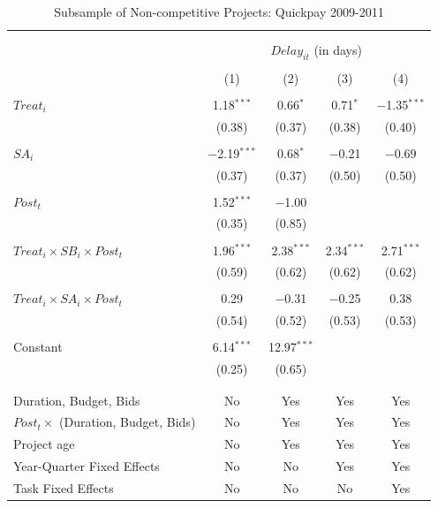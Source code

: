 \documentclass[
]{article}
\begin{document}
\begin{table}[H] \centering 
  \caption{Subsample of Non-competitive Projects: Quickpay 2009-2011} 
  \label{} 
\small 
\begin{tabular}{@{\extracolsep{-2pt}}lcccc} 
\\[-1.8ex]\hline 
\hline \\[-1.8ex] 
\\[-1.8ex] & \multicolumn{4}{c}{$Delay_{it}$ (in days)} \\ 
\\[-1.8ex] & (1) & (2) & (3) & (4)\\ 
\hline \\[-1.8ex] 
 $Treat_i$ & 1.18$^{***}$ & 0.66$^{*}$ & 0.71$^{*}$ & $-$1.35$^{***}$ \\ 
  & (0.38) & (0.37) & (0.38) & (0.40) \\ 
  & & & & \\ 
 $SA_i$ & $-$2.19$^{***}$ & 0.68$^{*}$ & $-$0.21 & $-$0.69 \\ 
  & (0.37) & (0.37) & (0.50) & (0.50) \\ 
  & & & & \\ 
 $Post_t$ & 1.52$^{***}$ & $-$1.00 &  &  \\ 
  & (0.35) & (0.85) &  &  \\ 
  & & & & \\ 
 $Treat_i \times SB_i \times Post_t$ & 1.96$^{***}$ & 2.38$^{***}$ & 2.34$^{***}$ & 2.71$^{***}$ \\ 
  & (0.59) & (0.62) & (0.62) & (0.62) \\ 
  & & & & \\ 
 $Treat_i \times SA_i \times Post_t$ & 0.29 & $-$0.31 & $-$0.25 & 0.38 \\ 
  & (0.54) & (0.52) & (0.53) & (0.53) \\ 
  & & & & \\ 
 Constant & 6.14$^{***}$ & 12.97$^{***}$ &  &  \\ 
  & (0.25) & (0.65) &  &  \\ 
  & & & & \\ 
\hline \\[-1.8ex] 
Duration, Budget, Bids & No & Yes & Yes & Yes \\ 
$Post_t \times $  (Duration, Budget, Bids) & No & Yes & Yes & Yes \\ 
Project age & No & Yes & Yes & Yes \\ 
Year-Quarter Fixed Effects & No & No & Yes & Yes \\ 
Task Fixed Effects & No & No & No & Yes \\ 

\end{tabular}
\end{table}
\end{document}
